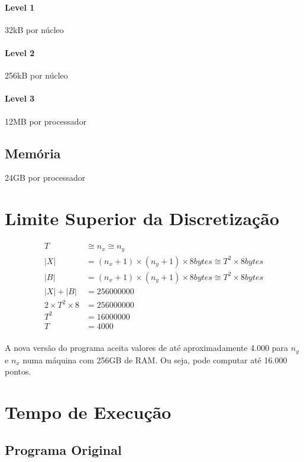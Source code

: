 \documentclass[12pt]{article}
\begin{document}
\paragraph{Level 1} 32kB por núcleo
\paragraph{Level 2} 256kB por núcleo
\paragraph{Level 3} 12MB por processador

\subsection{Memória}
24GB por processador

\newpage

\section{Limite Superior da Discretização}

\begin{align}
	T &\cong n_x \cong n_y \\
	|X| &= (n_x+1)\times(n_y+1)\times8 bytes \cong T^2\times8 bytes \\
	|B| &= (n_x+1)\times(n_y+1)\times8 bytes \cong T^2\times8 bytes \\
	|X| + |B| &= 256000000 \\
	2\times T^2\times8 &= 256000000 \\
	T^2 &= 16000000\\
	T &= 4000
\end{align}

\paragraph{}
A nova versão do programa aceita valores de até aproximadamente 4.000 para $n_y$ e $n_x$ numa máquina com 256GB de RAM.
Ou seja, pode computar até 16.000 pontos.

\newpage

\section{Tempo de Execução}

	\subsection{Programa Original}
\end{document}
